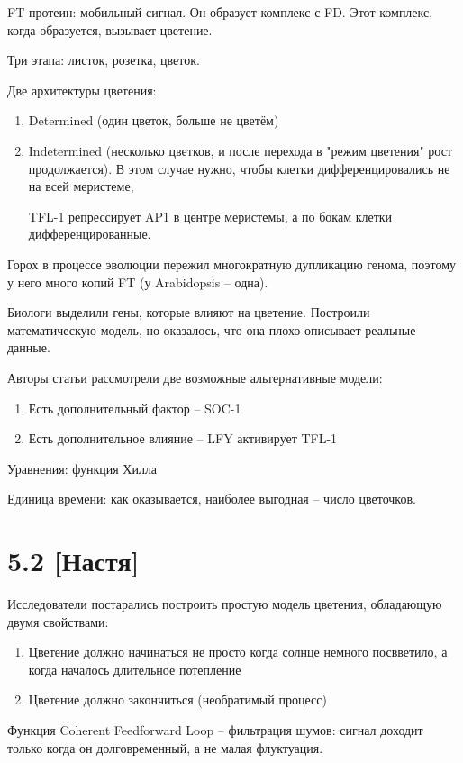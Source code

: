 \documentclass[a4paper,12pt]{article}
\begin{document}
FT-протеин: мобильный сигнал.
Он образует комплекс с FD.
Этот комплекс, когда образуется, вызывает цветение.

Три этапа: листок, розетка, цветок.

Две архитектуры цветения:
\begin{enumerate}[noitemsep]
	\item Determined (один цветок, больше не цветём)
	\item Indetermined (несколько цветков, и после перехода в "режим цветения" рост продолжается).
	В этом случае нужно, чтобы клетки дифференцировались не на всей меристеме,
	
	TFL-1 репрессирует AP1 в центре меристемы, а по бокам клетки дифференцированные.
\end{enumerate}

Горох в процессе эволюции пережил многократную дупликацию генома, поэтому у него много копий FT (у Arabidopsis -- одна).

Биологи выделили гены, которые влияют на цветение.
Построили математическую модель, но оказалось, что она плохо описывает реальные данные.

Авторы статьи рассмотрели две возможные альтернативные модели:
\begin{enumerate}[noitemsep]
	\item Есть дополнительный фактор -- SOC-1
	\item Есть дополнительное влияние -- LFY активирует TFL-1
\end{enumerate}

Уравнения: функция Хилла

Единица времени: как оказывается, наиболее выгодная -- число цветочков.

\section{5.2 [Настя]}

Исследователи постарались построить простую модель цветения, обладающую двумя свойствами:

\begin{enumerate}[noitemsep]
	\item Цветение должно начинаться не просто когда солнце немного посвветило, а когда началось длительное потепление
	\item Цветение должно закончиться (необратимый процесс)
\end{enumerate}

Функция Coherent Feedforward Loop -- фильтрация шумов: сигнал доходит только когда он долговременный, а не малая флуктуация.
\end{document}
